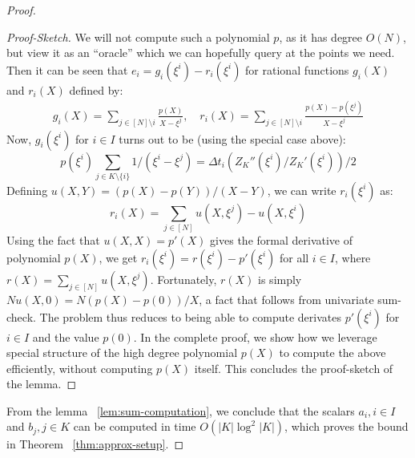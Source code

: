 \begin{proof}
\begin{proof}[Proof-Sketch]
        We will not compute such a polynomial $p$, as it has degree $O(N)$, but view it as an ``oracle'' which we can hopefully query at the points we need.
        Then it can be seen that $e_i=g_i(\xi^i) - r_i(\xi^i)$ for rational functions $g_i(X)$ and $r_i(X)$ defined by:
        \begin{align}\label{eq:rat-fun-f}
        g_i(X) =\sum_{j\in [N]\setminus i}\frac{p(X)}{X-\xi^j},\quad
        r_i(X) =\sum_{j\in [N]\setminus i} \frac{p(X)-p(\xi^j)}{X-\xi^j}
        \end{align}
        Now, $g_i(\xi^i)$ for $i\in I$ turns out to be (using the special case above):
        $$p(\xi^i)\sum_{j\in K\setminus \{i\}} 1/(\xi^i-\xi^j)=\Delta t_i (Z_K''(\xi^i)/Z_K'(\xi^i))/2$$
        Defining $u(X,Y)=(p(X)-p(Y))/(X-Y)$, we can write $r_i(\xi^i)$ as:
        \begin{equation}
            r_i(X) = \sum_{j\in [N]}u(X,\xi^j) - u(X,\xi^i)
        \end{equation}
        Using the fact that $u(X,X)=p'(X)$ gives the formal derivative of polynomial $p(X)$, we get
        $r_i(\xi^i)=r(\xi^i)-p'(\xi^i)$ for all $i\in I$, where $r(X)=\sum_{j\in [N]}u(X,\xi^j)$. Fortunately,
        $r(X)$ is simply $Nu(X,0)=N(p(X) - p(0))/X$, a fact that follows from univariate sum-check. The problem
        thus reduces to being able to compute derivates $p'(\xi^i)$ for $i\in I$ and the value $p(0)$. In the
        complete proof, we show how we leverage special structure of the high degree polynomial $p(X)$ to compute
        the above efficiently, without computing $p(X)$ itself. This concludes the proof-sketch of the lemma.
    \end{proof}

    From the lemma ~\ref{lem:sum-computation}, we conclude that the scalars $a_i,i\in I$ and $b_j, j\in K$ can be computed in
    time $O(|K|\log^2 |K|)$, which proves the bound in Theorem ~\ref{thm:approx-setup}.

\end{proof}

